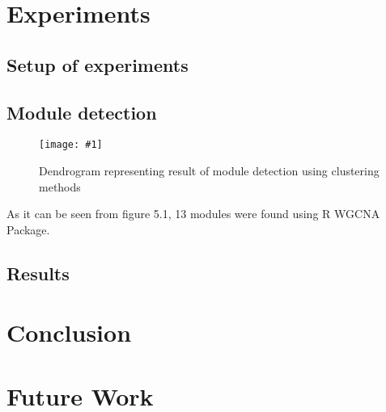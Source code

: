 \documentclass{ba-kecs}
\numberwithin{figure}{section}
\numberwithin{equation}{section}
\newcommand{\dkepic}[2]{ %
	\begin{figure}[H] %
	\texttt{[image: \#1]}
	\caption{#2}
	\label{#1}
	\end{figure}
}
\begin{document}
\section{Experiments}
\subsection{Setup of experiments}
\subsection{Module detection}
\dkepic{Dendrogram}{Dendrogram representing result of module detection using clustering methods}
As it can be seen from figure 5.1, 13 modules were found using R WGCNA Package.
\subsection{Results}

\section{Conclusion}

\section{Future Work}



\end{document}
